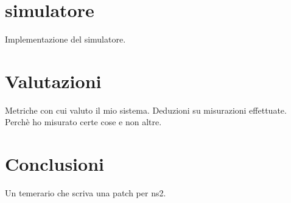 \documentclass[12pt,a4paper,openright,twoside]{book}
\begin{document}
\chapter{simulatore}
Implementazione del simulatore.

\chapter{Valutazioni}
Metriche con cui valuto il mio sistema. Deduzioni su misurazioni
effettuate. Perchè ho misurato certe cose e non altre.

\chapter*{Conclusioni}
Un temerario che scriva una patch per ns2.
\end{document}
